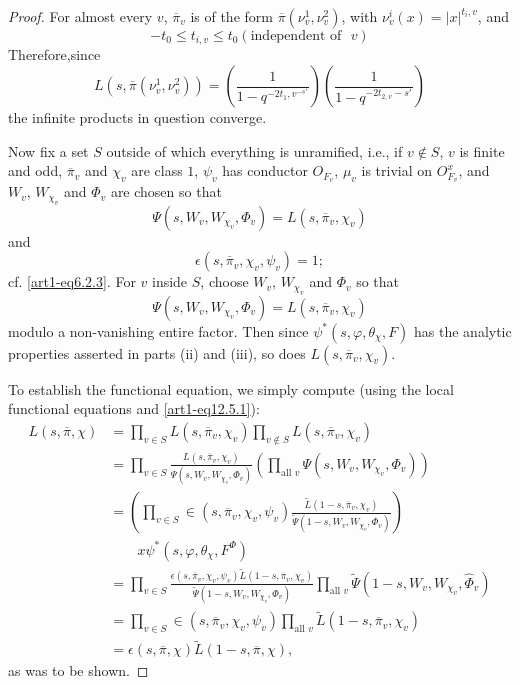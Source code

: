 \begin{proof}
For almost every $v$, $\overline{\pi}_{v}$ is of the form $\overline{\pi}(\nu^{1}_{v},\nu^{2}_{v})$, with $\nu^{i}_{v}(x)=|x|^{t_{i},v}$, and
$$
-t_{0}\leq t_{i,v}\leq t_{0}(\text{independent of~ } v)
$$
Therefore,\pageoriginale since
$$
L(s,\overline{\pi}(\nu^{1}_{v},\nu^{2}_{v}))=\left(\dfrac{1}{1-q^{-2t_{1},v^{-s'}}}\right)\left(\dfrac{1}{1-q^{-2t_{2,v}-s'}}\right)
$$
the infinite products in question converge.

Now fix a set $S$ outside of which everything is unramified, i.e., if $v\not\in S$, $v$ is finite and odd, $\overline{\pi}_{v}$ and $\chi_{v}$ are class $1$, $\psi_{v}$ has conductor $O_{F_{v}}$, $\mu_{v}$ is trivial on $O^{x}_{F_{v}}$, and $W_{v}$, $W_{\chi_{v}}$ and $\Phi_{v}$ are chosen so that
$$
\Psi(s,W_{v},W_{\chi_{v}},\Phi_{v})=L(s,\overline{\pi}_{v},\chi_{v})
$$
and
$$
\epsilon(s,\overline{\pi}_{v},\chi_{v},\psi_{v})=1;
$$
cf. \eqref{art1-eq6.2.3}. For $v$ inside $S$, choose $W_{v}$, $W_{\chi_{v}}$ and $\Phi_{v}$ so that 
$$
\Psi(s,W_{v},W_{\chi_{v}},\Phi_{v})=L(s,\overline{\pi}_{v},\chi_{v})
$$ 
modulo a non-vanishing entire factor. Then since $\psi^{*}(s,\varphi,\theta_{\chi},F)$ has the analytic properties asserted in parts (ii) and (iii), so does $L(s,\overline{\pi}_{v},\chi_{v})$.

To establish the functional equation, we simply compute (using the local functional equations and \eqref{art1-eq12.5.1}):
\begin{align*}
L(s,\overline{\pi},\chi) &= \prod\limits_{v\in S}L(s,\overline{\pi}_{v},\chi_{v})\prod\limits_{v\not\in S}L(s,\overline{\pi}_{v},\chi_{v})\\[4pt]
&= \prod\limits_{v\in S} \frac{L(s,\overline{\pi}_{v},\chi_{v})}{\Psi(s,W_{v},W_{\chi_{v}},\Phi_{v})}\left(\prod\limits_{\text{all~} v}\Psi(s,W_{v},W_{\chi_{v}},\Phi_{v})\right)\\[4pt]
&= \left(\prod\limits_{v\in S}\in (s,\overline{\pi}_{v},\chi_{v},\psi_{v})\frac{\widetilde{L}(1-s,\overline{\pi}_{v},\chi_{v})}{\widetilde{\Psi}(1-s,W_{v},W_{\chi_{v}},\Phi_{v})}\right)\\[4pt]
&\qquad x\psi^{*}(s,\varphi,\theta_{\chi},F^{\Phi})\\[4pt]
&=\prod\limits_{v\in S}\frac{\epsilon(s,\overline{\pi}_{v},\chi_{v},\psi_{v})\widetilde{L}(1-s,\overline{\pi}_{v},\chi_{v})}{\widetilde{\Psi}(1-s,W_{v},W_{\chi_{v}},\Phi_{v})}\prod\limits_{\text{all~}v}\widetilde{\Psi}(1-s,W_{v},W_{\chi_{v}},\widehat{\Phi}_{v})\\[4pt]
&= \prod\limits_{v\in S}\in(s,\overline{\pi}_{v},\chi_{v},\psi_{v})\prod\limits_{\text{all~}v}\widetilde{L}(1-s,\overline{\pi}_{v},\chi_{v})\\[4pt]
&= \epsilon(s,\overline{\pi},\chi)\widetilde{L}(1-s,\overline{\pi},\chi),
\end{align*}
as was to be shown.
\end{proof}


